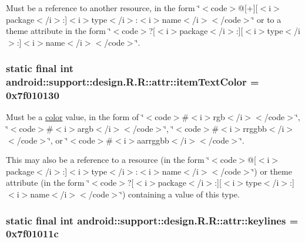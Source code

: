 Must be a reference to another resource, in the form \char`\"{}$<$code$>$@\mbox{[}+\mbox{]}\mbox{[}$<$i$>$package$<$/i$>$:\mbox{]}$<$i$>$type$<$/i$>$:$<$i$>$name$<$/i$>$$<$/code$>$\char`\"{} or to a theme attribute in the form \char`\"{}$<$code$>$?\mbox{[}$<$i$>$package$<$/i$>$:\mbox{]}\mbox{[}$<$i$>$type$<$/i$>$:\mbox{]}$<$i$>$name$<$/i$>$$<$/code$>$\char`\"{}. \hypertarget{classandroid_1_1support_1_1design_1_1_r_1_1attr_32428608710dff5a2e506e9280387c64}{
\subsubsection[{itemTextColor}]{\setlength{\rightskip}{0pt plus 5cm}static final int android::support::design.R.R::attr::itemTextColor = 0x7f010130}}
\label{classandroid_1_1support_1_1design_1_1_r_1_1attr_32428608710dff5a2e506e9280387c64}


Must be a \hyperlink{classandroid_1_1support_1_1design_1_1_r_1_1color}{color} value, in the form of \char`\"{}$<$code$>$\#$<$i$>$rgb$<$/i$>$$<$/code$>$\char`\"{}, \char`\"{}$<$code$>$\#$<$i$>$argb$<$/i$>$$<$/code$>$\char`\"{}, \char`\"{}$<$code$>$\#$<$i$>$rrggbb$<$/i$>$$<$/code$>$\char`\"{}, or \char`\"{}$<$code$>$\#$<$i$>$aarrggbb$<$/i$>$$<$/code$>$\char`\"{}. 

This may also be a reference to a resource (in the form \char`\"{}$<$code$>$@\mbox{[}$<$i$>$package$<$/i$>$:\mbox{]}$<$i$>$type$<$/i$>$:$<$i$>$name$<$/i$>$$<$/code$>$\char`\"{}) or theme attribute (in the form \char`\"{}$<$code$>$?\mbox{[}$<$i$>$package$<$/i$>$:\mbox{]}\mbox{[}$<$i$>$type$<$/i$>$:\mbox{]}$<$i$>$name$<$/i$>$$<$/code$>$\char`\"{}) containing a value of this type. \hypertarget{classandroid_1_1support_1_1design_1_1_r_1_1attr_c6719959a27c3af8fa1306c0e9ce2997}{
\subsubsection[{keylines}]{\setlength{\rightskip}{0pt plus 5cm}static final int android::support::design.R.R::attr::keylines = 0x7f01011c}}
\label{classandroid_1_1support_1_1design_1_1_r_1_1attr_c6719959a27c3af8fa1306c0e9ce2997}


